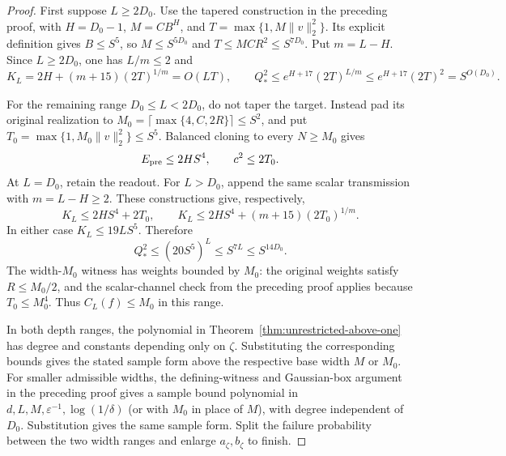 \begin{proof}
First suppose $L\ge2D_0$. Use the tapered construction in the preceding proof, with
$H=D_0-1$, $M=CB^H$, and $T=\max\{1,M\|v\|_2^2\}$.
Its explicit definition gives $B\le S^5$, so
$M\le S^{5D_0}$ and $T\le MC R^2\le S^{7D_0}$.
Put $m=L-H$. Since $L\ge2D_0$, one has $L/m\le2$ and
\[
 K_L=2H+(m+15)(2T)^{1/m}=O(LT),\qquad
 Q_*^2\le e^{H+17}(2T)^{L/m}
          \le e^{H+17}(2T)^2=S^{O(D_0)}.
\]

For the remaining range $D_0\le L<2D_0$, do not taper the target.
Instead pad its original realization to
$M_0=\lceil\max\{4,C,2R\}\rceil\le S^2$, and put
$T_0=\max\{1,M_0\|v\|_2^2\}\le S^5$.
Balanced cloning to every $N\ge M_0$ gives
\[
 E_{\rm pre}\le2H S^4,\qquad c^2\le2T_0.
\]
At $L=D_0$, retain the readout. For $L>D_0$, append the same scalar
transmission with $m=L-H\ge2$. These constructions give, respectively,
\[
 K_L\le2H S^4+2T_0,
 \qquad
 K_L\le2H S^4+(m+15)(2T_0)^{1/m}.
\]
In either case $K_L\le19LS^5$. Therefore
\[
 Q_*^2\le(20S^5)^L\le S^{7L}\le S^{14D_0}.
\]
The width-$M_0$ witness has weights bounded by $M_0$: the original
weights satisfy $R\le M_0/2$, and the scalar-channel check from the
preceding proof applies because $T_0\le M_0^4$.
Thus $C_L(f)\le M_0$ in this range.

In both depth ranges, the polynomial in
Theorem~\ref{thm:unrestricted-above-one} has degree and constants
depending only on $\zeta$. Substituting the corresponding bounds gives
the stated sample form above the respective base width $M$ or $M_0$.
For smaller admissible widths, the defining-witness and Gaussian-box
argument in the preceding proof gives a sample bound polynomial in
$d,L,M,\varepsilon^{-1},\log(1/\delta)$ (or with $M_0$ in place of $M$),
with degree independent of $D_0$. Substitution gives the same sample form.
Split the failure probability between the two width ranges and enlarge
$a_\zeta,b_\zeta$ to finish.
\end{proof}
